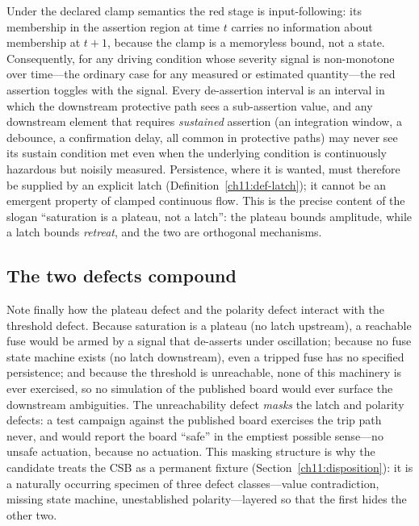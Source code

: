 \begin{remark}\label{ch11:rem-following}
Under the declared clamp semantics the red stage is input-following: its membership in the assertion region at time $t$ carries no information about membership at $t+1$, because the clamp is a memoryless bound, not a state. Consequently, for any driving condition whose severity signal is non-monotone over time---the ordinary case for any measured or estimated quantity---the red assertion toggles with the signal. Every de-assertion interval is an interval in which the downstream protective path sees a sub-assertion value, and any downstream element that requires \emph{sustained} assertion (an integration window, a debounce, a confirmation delay, all common in protective paths) may never see its sustain condition met even when the underlying condition is continuously hazardous but noisily measured. Persistence, where it is wanted, must therefore be supplied by an explicit latch (Definition~\ref{ch11:def-latch}); it cannot be an emergent property of clamped continuous flow. This is the precise content of the slogan ``saturation is a plateau, not a latch'': the plateau bounds amplitude, while a latch bounds \emph{retreat}, and the two are orthogonal mechanisms.
\end{remark}

\subsection{The two defects compound}

Note finally how the plateau defect and the polarity defect interact with the threshold defect. Because saturation is a plateau (no latch upstream), a reachable fuse would be armed by a signal that de-asserts under oscillation; because no fuse state machine exists (no latch downstream), even a tripped fuse has no specified persistence; and because the threshold is unreachable, none of this machinery is ever exercised, so no simulation of the published board would ever surface the downstream ambiguities. The unreachability defect \emph{masks} the latch and polarity defects: a test campaign against the published board exercises the trip path never, and would report the board ``safe'' in the emptiest possible sense---no unsafe actuation, because no actuation. This masking structure is why the candidate treats the CSB as a permanent fixture (Section~\ref{ch11:disposition}): it is a naturally occurring specimen of three defect classes---value contradiction, missing state machine, unestablished polarity---layered so that the first hides the other two.

